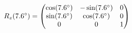 \documentclass[preview]{standalone}
\begin{document}
\begin{align*}
\special{dvisvgm:raw <g id='unique000'>}R_z(7.6^\circ) = \begin{pmatrix} \cos(7.6^\circ) & -\sin(7.6^\circ) & 0 \\ \sin(7.6^\circ) & \cos(7.6^\circ) & 0 \\ 0 & 0 & 1 \end{pmatrix}\special{dvisvgm:raw </g>}
\end{align*}
\end{document}
